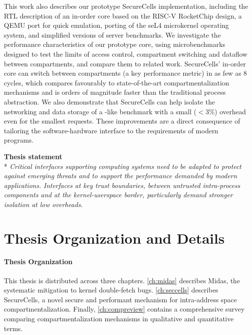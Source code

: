 This work also describes our prototype SecureCells implementation, including
the RTL description of an in-order core based on the RISC-V RocketChip design,
a QEMU port for quick emulation, porting of the seL4 microkernel operating
system, and simplified versions of server benchmarks.
We investigate the performance characteristics of our prototype core, using
microbenchmarks designed to test the limits of access control, compartment 
switching and dataflow between compartments, and compare them to related work.
SecureCells' in-order core can switch between compartments (a key performance
metric) in as few as 8 cycles, which compares favourably to state-of-the-art
compartmentalization mechanisms and is orders of magnitude faster than the
traditional process abstraction.
We also demonstrate that SecureCells can help isolate the networking and
data storage of a -like benchmark with a small ($<3\%$)
overhead even for the smallest requests.
These improvements are a direct consequence of tailoring the software-hardware
interface to the requirements of modern programs.

\begin{center}
      \textbf{Thesis statement}\\*
\emph{
      Critical interfaces supporting computing systems need to be
      adapted to protect against emerging threats and to support the 
      performance demanded by modern applications.
      Interfaces at key trust boundaries, between 
      untrusted intra-process components
      and at the kernel-userspace border, 
      particularly demand stronger isolation at low overheads.
}
\end{center}


\section{Thesis Organization and Details}

\paragraph{Thesis Organization}
This thesis is distributed across three chapters. 
\autoref{ch:midas} describes Midas, the systematic mitigation to
kernel double-fetch bugs.
\autoref{ch:seccells} describes SecureCells, a novel secure and performant 
mechanism for intra-address space compartmentalization.
Finally, \autoref{ch:compreview} contains a comprehensive survey comparing
compartmentalization mechanisms in qualitative and quantitative terms.

